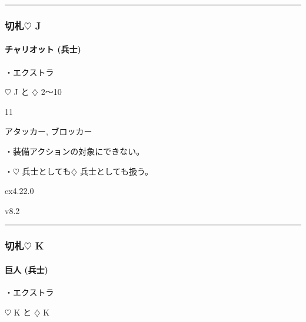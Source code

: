 \documentclass[letterpaper,10pt,dvipdfmx]{sphinxmanual}
\begin{document}
\bigskip\hrule\bigskip



\subsubsection{切札{\normalsize $\heartsuit$} J}
\label{\detokenize{auto/frameActionlist:id91}}

\paragraph{チャリオット (兵士)}
\label{\detokenize{auto/frameActionlist:char-chariot}}\label{\detokenize{auto/frameActionlist:id92}}
\sphinxAtStartPar
{}

\sphinxAtStartPar
・エクストラ

\sphinxAtStartPar
{} {\normalsize $\heartsuit$} J と {\normalsize $\diamondsuit$} 2〜10

\sphinxAtStartPar
{} 11

\sphinxAtStartPar
{} アタッカー, ブロッカー

\sphinxAtStartPar
{}

\sphinxAtStartPar
・装備アクションの対象にできない。

\sphinxAtStartPar
・{\normalsize $\heartsuit$} 兵士としても{\normalsize $\diamondsuit$} 兵士としても扱う。

\sphinxAtStartPar
{}  ex4.22.0

\sphinxAtStartPar
{}  v8.2


\bigskip\hrule\bigskip



\subsubsection{切札{\normalsize $\heartsuit$} K}
\label{\detokenize{auto/frameActionlist:id93}}

\paragraph{巨人 (兵士)}
\label{\detokenize{auto/frameActionlist:char-giant}}\label{\detokenize{auto/frameActionlist:id94}}
\sphinxAtStartPar
{}

\sphinxAtStartPar
・エクストラ

\sphinxAtStartPar
{} {\normalsize $\heartsuit$} K と {\normalsize $\diamondsuit$} K
\end{document}
